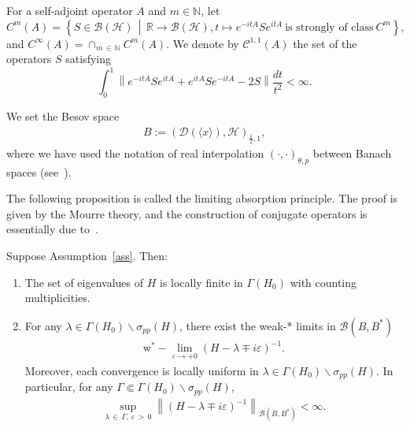 \documentclass[10pt]{amsart}
\theoremstyle{definition}\newtheorem{defi}[theo]{Definition}\newtheorem{rema}[theo]{Remark}\newtheorem{exam}[theo]{Example}\newtheorem{exem}[theo]{Example}\newtheorem{nota}[theo]{Notation}
\newcommand{\e}{\varepsilon}
\renewcommand{\l}{\lambda}
\newcommand{\s}{\sigma}
\newcommand{\R}{\mathbb{R}}
\newcommand{\bbN}{\mathbb{N}}
\newcommand{\HS}{\mathcal{H}}
\newcommand{\BS}{\mathcal{B}}
\newcommand{\CS}{\mathcal{C}}
\newcommand{\DS}{\mathcal{D}}
\newcommand{\jap}[1]{\langle #1 \rangle}
\begin{document}
For a self-adjoint operator $A$ and $m\in\bbN$, let
\[
C^m(A)=\left\{ S\in\BS(\HS) \,\middle|\, \R\to\BS(\HS),t\mapsto e^{-itA}Se^{itA} \ \text{is strongly of class} \ C^m \right\},
\]
and $C^\infty(A)=\cap_{m\,\in\,\bbN}C^m(A)$. We denote by $\CS^{1,1}(A)$ the set of the operators $S$ satisfying
\[
\int_0^1 \left\| e^{-itA} S e^{itA}+e^{itA} S e^{-itA}-2S \right\| \frac{dt}{t^2} < \infty.
\]


We set the Besov space
\begin{align*}
B:=(\DS(\jap{x}),\HS)_{\frac{1}{2},1},
\end{align*}
where we have used the notation of real interpolation $(\cdot,\cdot)_{\theta,p}$ between Banach spaces (see~\cite[Section~2.1]{A-BdM-G}).

The following proposition is called the limiting absorption principle. The proof is given by the Mourre theory, and the construction of conjugate operators is essentially due to~\cite[Lemma~6.2]{P-R}.

\begin{prop}\label{LAP prop}
Suppose Assumption~\ref{ass}. Then:
\begin{enumerate}
\item\label{prop3.1.1} The set of eigenvalues of $H$ is locally finite in $\Gamma(H_0)$ with counting multiplicities.

\item\label{prop3.1.2} For any $\lambda \in \Gamma(H_0)\backslash \s_{pp}(H)$, there exist the weak-* limits in $\BS(B,B^*)$
\begin{align*}
\operatorname{w^*-}\lim_{\e\to+0} (H-\l\mp i\e)^{-1}.
\end{align*}
Moreover, each convergence is locally uniform in $\l\in\Gamma(H_0)\backslash \s_{pp}(H)$. In particular, for any $\Gamma\Subset\Gamma(H_0)\backslash \s_{pp}(H)$,
\begin{align}\label{LAP}
\sup_{\l\,\in\,\Gamma,\,\e\,>\,0} \left\|(H-\l\mp i\e)^{-1}\right\|_{\BS(B,B^*)} < \infty.
\end{align}
\end{enumerate}
\end{prop}
\end{document}
